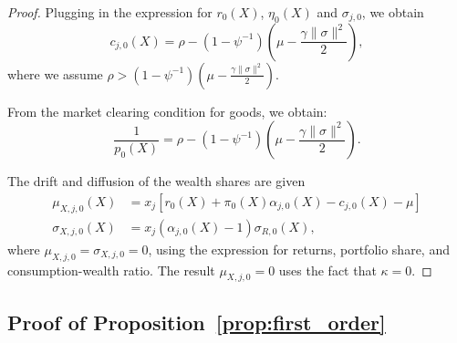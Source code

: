 \begin{proof}
Plugging in the expression for $r_0(X)$, $\eta_0(X)$ and $\sigma_{j,0}$, we obtain
\begin{equation}
    c_{j,0}(X) = \rho  - \left(1-\psi^{-1}\right)  \left( \mu - \frac{\gamma\|\sigma\|^2}{2} \right),
\end{equation}
where we assume $\rho  > \left(1-\psi^{-1}\right)  \left( \mu - \frac{\gamma\|\sigma\|^2}{2} \right)$.

From the market clearing condition for goods, we obtain:
\begin{equation}
    \frac{1}{p_0(X)} = \rho  - \left(1-\psi^{-1}\right)  \left( \mu - \frac{\gamma\|\sigma\|^2}{2} \right).
\end{equation}

The drift and diffusion of the wealth shares are given 
\begin{align}
    \mu_{X,j,0}(X) &= x_j \left[ r_0(X) + \pi_0(X) \alpha_{j,0}(X) - c_{j,0}(X) -\mu   \right]\\
    \sigma_{X,j,0}(X) &= x_j (\alpha_{j,0}(X) - 1)\sigma_{R,0}(X),
\end{align}
where $\mu_{X,j,0} = \sigma_{X,j,0} = 0$, using the expression for returns, portfolio share, and consumption-wealth ratio. The result  $\mu_{X,j,0} = 0$ uses the fact that $\kappa = 0$.
\end{proof}

\subsection{Proof of Proposition~\ref{prop:first_order}}\label{app:prop_first_order}

